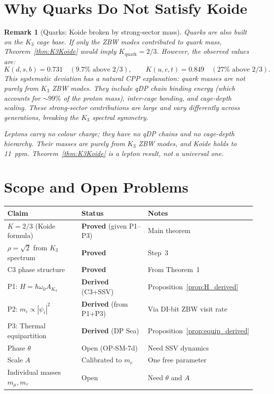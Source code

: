 \documentclass[11pt]{article}
\newtheorem{remark}{Remark}[section]
\begin{document}
\section{Why Quarks Do Not Satisfy Koide}

\begin{remark}[Quarks: Koide broken by strong-sector mass]
\label{rem:quarks}
Quarks are also built on the $K_3$ cage base.  If only the ZBW modes
contributed to quark mass, Theorem~\ref{thm:K3Koide} would imply
$K_{\mathrm{quark}} = 2/3$.  However, the observed values are:
\[
K(d,s,b) = 0.731 \quad(9.7\% \text{ above } 2/3), \qquad
K(u,c,t) = 0.849 \quad(27\% \text{ above } 2/3).
\]
This systematic deviation has a natural CPP explanation: quark masses
are \emph{not} purely from $K_3$ ZBW modes.  They include qDP chain
binding energy (which accounts for $\sim\!99\%$ of the proton mass),
inter-cage bonding, and cage-depth scaling.  These strong-sector
contributions are large and vary differently across generations, breaking
the $K_3$ spectral symmetry.

Leptons carry no colour charge; they have no qDP chains and no cage-depth
hierarchy.  Their masses \emph{are} purely from $K_3$ ZBW modes, and
Koide holds to 11~ppm.  Theorem~\ref{thm:K3Koide} is a lepton result,
not a universal one.
\end{remark}

\section{Scope and Open Problems}

\begin{center}
\renewcommand{\arraystretch}{1.2}
\begin{tabular}{p{5.5cm}lp{5cm}}
\toprule
Claim & Status & Notes \\
\midrule
$K = 2/3$ (Koide formula) & \textbf{Proved} (given P1--P3) & Main theorem \\
$\rho = \sqrt{2}$ from $K_3$ spectrum & \textbf{Proved} & Step~3 \\
C3 phase structure & \textbf{Proved} & From Theorem~1 \\
P1: $H = \hbar\omega_0 A_{K_3}$ & \textbf{Derived} (C3+SSV) & Proposition~\ref{prop:H_derived} \\
P2: $m_i \propto |\psi_i|^2$ & \textbf{Derived} (from P1+P3) & Via DI-bit ZBW visit rate \\
P3: Thermal equipartition & \textbf{Derived} (DP Sea) & Proposition~\ref{prop:equip_derived} \\
Phase $\theta$ & Open (OP-SM-7d) & Need SSV dynamics \\
Scale $A$ & Calibrated to $m_e$ & One free parameter \\
Individual masses $m_\mu,m_\tau$ & Open & Need $\theta$ and $A$ \\
\bottomrule
\end{tabular}
\end{center}
\end{document}
